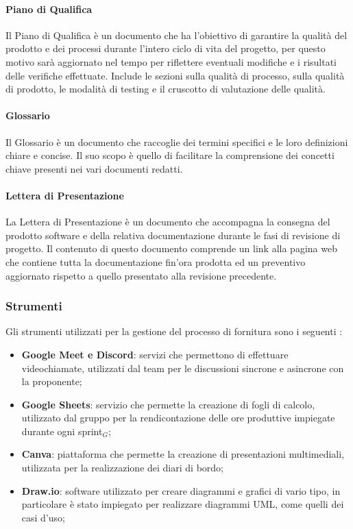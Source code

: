     \paragraph{Piano di Qualifica}
    Il Piano di Qualifica è un documento che ha l'obiettivo di garantire la qualità del prodotto e dei processi durante l'intero ciclo di vita del progetto, per questo motivo sarà aggiornato nel tempo per riflettere eventuali modifiche e i risultati delle verifiche effettuate. Include le sezioni sulla qualità di processo, sulla qualità di prodotto, le modalità di testing e il cruscotto di valutazione delle qualità.\\

    \paragraph{Glossario}
    Il Glossario è un documento che raccoglie dei termini specifici e le loro definizioni chiare e concise. Il suo scopo è quello di facilitare la comprensione dei concetti chiave presenti nei vari documenti redatti.\\

    \paragraph{Lettera di Presentazione}
    La Lettera di Presentazione è un documento che accompagna la consegna del prodotto software e della relativa documentazione durante le fasi di revisione di progetto. Il contenuto di questo documento comprende un link alla pagina web che contiene tutta la documentazione fin'ora prodotta ed un preventivo aggiornato rispetto a quello presentato alla revisione precedente.\\

\subsubsection{Strumenti}
 Gli strumenti utilizzati per la gestione del processo di fornitura sono i seguenti :
 \begin{itemize}
    \item \textbf{Google Meet e Discord}: servizi che permettono di effettuare videochiamate, utilizzati dal team per le discussioni sincrone e asincrone con la proponente;
    \item \textbf{Google Sheets}: servizio che permette la creazione di fogli di calcolo, utilizzato dal gruppo per la rendicontazione delle ore produttive impiegate durante ogni sprint$_G$;
    \item \textbf{Canva}: piattaforma che permette la creazione di presentazioni multimediali, utilizzata per la realizzazione dei diari di bordo;
    \item \textbf{Draw.io}: software utilizzato per creare diagrammi e grafici di vario tipo, in particolare è stato impiegato per realizzare diagrammi UML, come quelli dei casi d’uso;
 \end{itemize}